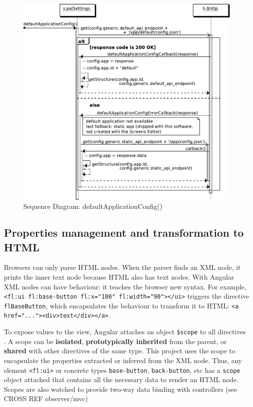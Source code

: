 \begin{figure}[htb]
    \centering
    \includegraphics{figures/design/seqdia/palSettings-defaultApplicationConfig.pdf}
    \caption{Sequence Diagram: defaultApplicationConfig()}
    \label{fig:design-seqdia-palSettings-defaultApplicationConfig}
\end{figure}

\FloatBarrier

\subsection{Properties management and transformation to \ac{HTML}}
Browsers can only parse \ac{HTML} nodes.
When the parser finds an \ac{XML} node, it prints the inner text node because \ac{HTML} also has text nodes.
With Angular \ac{XML} nodes can have behaviour: it teaches the browser new syntax.
For example, \lstinline$<fl:ui fl:base-button fl:x="100" fl:width="90"></ui>$ triggers the directive \lstinline$flBaseButton$, which encapsulates the behaviour to transform it to \ac{HTML}: \lstinline$<a href="..."><div>text</div></a>$.

To expose values to the view, Angular attaches an object \texttt{\$scope} to all directives  .
A scope can be \textbf{isolated}, \textbf{prototypically inherited} from the parent, or \textbf{shared} with other directives of the same type.
This project uses the scope to encapsulate the properties extracted or inferred from the \ac{XML} node.
Thus, any element \lstinline$<fl:ui>$ or concrete types \lstinline$base-button$, \lstinline$back-button$, etc has a \texttt{scope} object attached that contains all the necessary data to render an \ac{HTML} node.
Scopes are also watched to provide two-way data binding with controllers (see CROSS REF observer/mvc)

